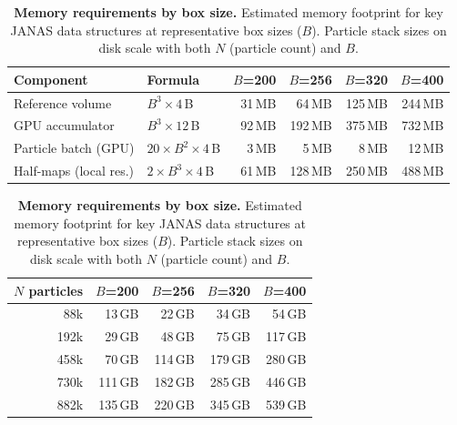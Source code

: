 %

\begin{table}[!ht]
\caption{\textbf{Memory requirements by box size.}
Estimated memory footprint for key JANAS data structures at representative box sizes ($B$). Particle stack sizes on disk scale with both $N$ (particle count) and $B$.}
\label{tab:memory}
\centering
\small

\begin{tabular}{@{}l l r r r r@{}}
\toprule
\textbf{Component} & \textbf{Formula} & \textbf{$B$=200} & \textbf{$B$=256} & \textbf{$B$=320} & \textbf{$B$=400} \\
\midrule
Reference volume       & $B^3 \times 4$\,B        & 31\,MB  & 64\,MB  & 125\,MB & 244\,MB \\
GPU accumulator        & $B^3 \times 12$\,B       & 92\,MB  & 192\,MB & 375\,MB & 732\,MB \\
Particle batch (GPU)   & $20 \times B^2 \times 4$\,B & 3\,MB & 5\,MB   & 8\,MB   & 12\,MB  \\
Half-maps (local res.) & $2 \times B^3 \times 4$\,B  & 61\,MB & 128\,MB & 250\,MB & 488\,MB \\
\bottomrule
\end{tabular}

\vspace{8pt}

\begin{tabular}{@{}r r r r r@{}}
\toprule
\textbf{$N$ particles} & \textbf{$B$=200} & \textbf{$B$=256} & \textbf{$B$=320} & \textbf{$B$=400} \\
\midrule
88k   & 13\,GB  & 22\,GB  & 34\,GB  & 54\,GB  \\
192k  & 29\,GB  & 48\,GB  & 75\,GB  & 117\,GB \\
458k  & 70\,GB  & 114\,GB & 179\,GB & 280\,GB \\
730k  & 111\,GB & 182\,GB & 285\,GB & 446\,GB \\
882k  & 135\,GB & 220\,GB & 345\,GB & 539\,GB \\
\bottomrule
\end{tabular}
\end{table}
